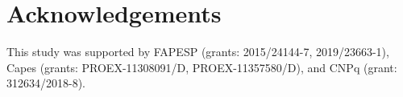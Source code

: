 \documentclass{article}
\begin{document}


\section{Acknowledgements}
This study was supported by 
FAPESP (grants: 2015/24144-7, 2019/23663-1),
Capes (grants:  PROEX-11308091/D, PROEX-11357580/D), and CNPq (grant: 312634/2018-8).




   
   
\end{document}
